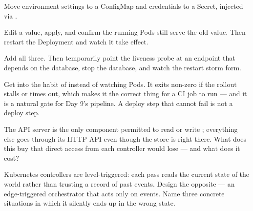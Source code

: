 Move environment settings to a ConfigMap and credentials to a Secret, injected via .

Edit a value, apply, and confirm the running Pods still serve the old value. Then restart the Deployment and watch it take effect.

Add all three. Then temporarily point the liveness probe at an endpoint that depends on the database, stop the database, and watch the restart storm form.

\begin{prodtip}
Get into the habit of  instead of watching Pods. It exits non-zero if the rollout stalls or times out, which makes it the correct thing for a CI job to run --- and it is a natural gate for Day 9's pipeline. A deploy step that cannot fail is not a deploy step.
\end{prodtip}


\begin{thinkbox}
The API server is the only component permitted to read or write ; everything else goes through its HTTP API even though the store is right there. What does this buy that direct  access from each controller would lose --- and what does it cost?
\end{thinkbox}

\begin{thinkbox}
Kubernetes controllers are level-triggered: each pass reads the current state of the world rather than trusting a record of past events. Design the opposite --- an edge-triggered orchestrator that acts only on events. Name three concrete situations in which it silently ends up in the wrong state.
\end{thinkbox}

